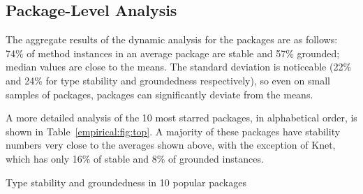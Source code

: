 
\subsection{Package-Level Analysis}

The aggregate results of the dynamic analysis for the \goodpkgsnum packages are
as follows: 74\% of method instances in an average package are stable and 57\%
grounded; median values are close to the means. The standard deviation is
noticeable (22\% and 24\% for type stability and groundedness respectively), so
even on small samples of packages, packages can significantly deviate from
the means.

A more detailed analysis of the 10 most starred packages, in alphabetical order,
is shown in Table~\ref{empirical:fig:top}. A majority of these packages have
stability numbers very close to the averages shown above, with the exception of
Knet, which has only 16\% of stable and 8\% of grounded instances.


\begin{table}[h]\small
\caption{Type stability and groundedness in 10 popular packages}%
\label{empirical:fig:top}
\centering

\end{table}


